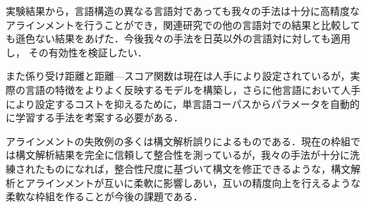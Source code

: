 \documentclass[japanese]{jnlp_1.4}
\begin{document}
実験結果から，言語構造の異なる言語対であっても我々の手法は十分に高精度な
アラインメントを行うことができ，関連研究での他の言語対での結果と比較して
も遜色ない結果をあげた．今後我々の手法を日英以外の言語対に対しても適用し，
その有効性を検証したい．

また係り受け距離と距離—スコア関数は現在は人手により設定されているが，実
際の言語の特徴をよりよく反映するモデルを構築し，さらに他言語において人手
により設定するコストを抑えるために，単言語コーパスからパラメータを自動的
に学習する手法を考案する必要がある．


アラインメントの失敗例の多くは構文解析誤りによるものである．現在の枠組で
は構文解析結果を完全に信頼して整合性を測っているが，我々の手法が十分に洗
練されたものになれば，整合性尺度に基づいて構文を修正できるような，構文解
析とアラインメントが互いに柔軟に影響しあい，互いの精度向上を行えるような
柔軟な枠組を作ることが今後の課題である．
\end{document}
